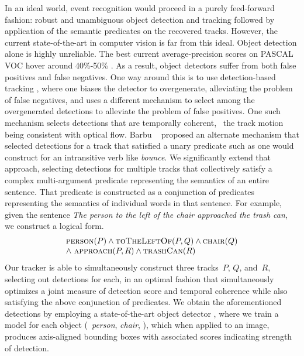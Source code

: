 In an ideal world, event recognition would proceed in a purely feed-forward
fashion: robust and unambiguous object detection and tracking followed by
application of the semantic predicates on the recovered tracks.
%
However, the current state-of-the-art in computer vision is far from this
ideal.
%
Object detection alone is highly unreliable.
%
The best current average-precision scores on PASCAL VOC hover around 40\%-50\%
\citep{Everingham10}.
%
As a result, object detectors suffer from both false positives and false
negatives.
%
One way around this is to use detection-based tracking \citep{Wolf1989}, where
one biases the detector to overgenerate, alleviating the problem of false
negatives, and uses a different mechanism to select among the overgenerated
detections to alleviate the problem of false positives.
%
One such mechanism selects detections that are temporally coherent, \ie\ the
track motion being consistent with optical flow.
%
Barbu \etal\ \cite{Barbu2012b} proposed an alternate mechanism that
selected detections for a track that satisfied a unary predicate such as one
would construct for an intransitive verb like \emph{bounce}.
%
We significantly extend that approach, selecting detections for multiple tracks
that collectively satisfy a complex multi-argument predicate representing the
semantics of an entire sentence.
%
That predicate is constructed as a conjunction of predicates representing the
semantics of individual words in that sentence.
%
For example, given the sentence \emph{The person to the left of the chair
  approached the trash can}, we construct a logical form.
%
\begin{equation*}
  \begin{array}[t]{l}
    \textsc{person}(P)\wedge
    \textsc{toTheLeftOf}(P,Q)\wedge
    \textsc{chair}(Q)\\
    \wedge\ \textsc{approach}(P,R)\wedge
    \textsc{trashCan}(R)
  \end{array}
\end{equation*}
%
Our tracker is able to simultaneously construct three tracks~$P$, $Q$, and~$R$,
selecting out detections for each, in an optimal fashion that simultaneously
optimizes a joint measure of detection score and temporal coherence while also
satisfying the above conjunction of predicates.
%
We obtain the aforementioned detections by employing a state-of-the-art object
detector \citep{Felzenszwalb2010b}, where we train a model for each object
(\eg\ \emph{person}, \emph{chair}, \etc), which when applied to an image,
produces axis-aligned bounding boxes with associated scores indicating strength
of detection.

